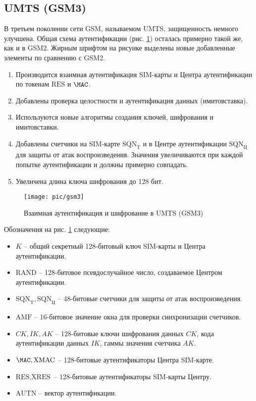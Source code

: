 \subsection{UMTS (GSM3)}

В третьем поколении сети GSM, называемом UMTS, защищенность немного улучшена. Общая схема аутентификации (рис. \ref{fig:gsm3}) осталась примерно такой же, как и в GSM2. Жирным шрифтом на рисунке выделены новые добавленные элементы по сравнению с GSM2.
\begin{enumerate}
    \item Производится взаимная аутентификация SIM-карты и Центра аутентификации по токенам $\textrm{RES}$ и $\MAC$.
    \item Добавлены проверка целостности и аутентификация данных (имитовставка).
    \item Используются новые алгоритмы создания ключей, шифрования и имитовставки.
    \item Добавлены счетчики на SIM-карте $\textrm{SQN}_\textrm{T}$ и в Центре аутентификации $\textrm{SQN}_\textrm{Ц}$ для защиты от атак воспроизведения. Значения увеличиваются при каждой попытке аутентификации и должны примерно совпадать.
    \item Увеличена длина ключа шифрования до 128 бит.
\end{enumerate}

\begin{figure}[h!]
	\centering
	\texttt{[image: pic/gsm3]}
	\caption{Взаимная аутентификация и шифрование в UMTS (GSM3)\label{fig:gsm3}}
\end{figure}

Обозначения на рис. \ref{fig:gsm3} следующие:
\begin{itemize}
    \item $K$ -- общий секретный 128-битовый ключ SIM-карты и Центра аутентификации.
    \item $\textrm{RAND}$ -- 128-битовое псевдослучайное число, создаваемое Центром аутентификации.
    \item $\textrm{SQN}_\textrm{T}, \textrm{SQN}_\textrm{Ц}$ -- 48-битовые счетчики для защиты от атак воспроизведения.
    \item $\textrm{AMF}$ -- 16-битовое значение окна для проверки синхронизации счетчиков.
    \item $CK, IK, AK$ -- 128-битовые ключи шифрования данных $CK$, кода аутентификации данных $IK$, гаммы значения счетчика $AK$.
    \item $\MAC, \textrm{XMAC}$ -- 128-битовые аутентификаторы Центра SIM-карте.
    \item $\textrm{RES}, \textrm{XRES}$ -- 128-битовые аутентификаторы SIM-карты Центру.
    \item $\textrm{AUTN}$ -- вектор аутентификации.
\end{itemize}

